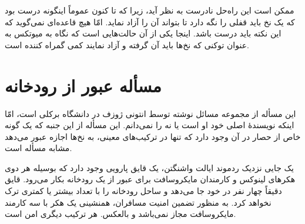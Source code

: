 \documentclass{book}
\begin{document}
    ممکن است این راه‌حل نادرست به نظر آید، زیرا که تا کنون عموماً اینگونه درست بود که یک نخ باید قفلی را نگه دارد تا بتواند آن را آزاد نماید. 
    امّا هیچ قاعده‌ای نمی‌گوید که  این نکته باید درست باشد. اینجا یکی از آن حالت‌هایی است که نگاه به میوتکس به عنوان توکنی که نخ‌ها باید آن گرفته و آزاد 
    نمایند کمی گمراه کننده است. 
    

\section {مسأله عبور از رودخانه}

    این مسأله از مجموعه مسائل نوشته توسط انتونی ژوزف در دانشگاه برکلی
    است، امّا اینکه نویسندهٔ اصلی خود او است یا نه را نمی‌دانم. این مسأله از این جنبه که یک گونه خاص از حصار در آن وجود دارد که تنها در ترکیب‌های 
    معینی، به نخ‌ها اجازه عبور می‌دهد مشابه مسأله  است. 

    یک جایی نزدیک ردموند ایالت واشنگتن، یک قایق پارویی وجود دارد که بوسیله هر دوی هکرهای لینوکس و 
    کارمندان مایکروسافت برای عبور از یک رودخانه بکار می‌رود.  قایق دقیقاً چهار نفر در خود جا می‌دهد و ساحل رودخانه را با تعداد بیشتر یا کمتری ترک نخواهد کرد. 
    به منظور تضمین امنیت مسافران، همنشینی یک هکر با سه کارمند مایکروسافت مجاز نمی‌باشد و بالعکس. هر ترکیب دیگری امن است. 
\end{document}

